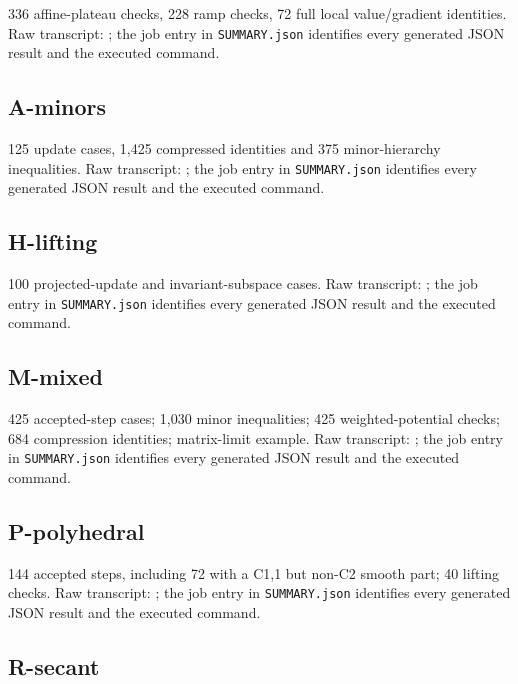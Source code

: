 \documentclass[10pt,oneside,openany]{book}
\theoremstyle{remark}\newtheorem{remark}{Remark}[chapter]
\begin{document}
336 affine-plateau checks, 228 ramp checks, 72 full local value/gradient identities. Raw transcript: ; the job entry in \texttt{SUMMARY.json} identifies every generated JSON result and the executed command.

\subsection{A-minors}\label{a-minors}

125 update cases, 1,425 compressed identities and 375 minor-hierarchy inequalities. Raw transcript: ; the job entry in \texttt{SUMMARY.json} identifies every generated JSON result and the executed command.

\subsection{H-lifting}\label{h-lifting}

100 projected-update and invariant-subspace cases. Raw transcript: ; the job entry in \texttt{SUMMARY.json} identifies every generated JSON result and the executed command.

\subsection{M-mixed}\label{m-mixed}

425 accepted-step cases; 1,030 minor inequalities; 425 weighted-potential checks; 684 compression identities; matrix-limit example. Raw transcript: ; the job entry in \texttt{SUMMARY.json} identifies every generated JSON result and the executed command.

\subsection{P-polyhedral}\label{p-polyhedral}

144 accepted steps, including 72 with a C1,1 but non-C2 smooth part; 40 lifting checks. Raw transcript: ; the job entry in \texttt{SUMMARY.json} identifies every generated JSON result and the executed command.

\subsection{R-secant}\label{r-secant}
\end{document}
